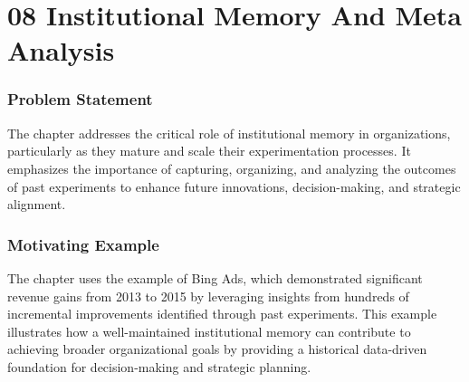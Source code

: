 \documentclass{article}
\begin{document}
\section*{08 Institutional Memory And Meta Analysis}
\subsubsection*{Problem Statement}
The chapter addresses the critical role of institutional memory in organizations, particularly as they mature and scale their experimentation processes. It emphasizes the importance of capturing, organizing, and analyzing the outcomes of past experiments to enhance future innovations, decision-making, and strategic alignment.

\subsubsection*{Motivating Example}
The chapter uses the example of Bing Ads, which demonstrated significant revenue gains from 2013 to 2015 by leveraging insights from hundreds of incremental improvements identified through past experiments. This example illustrates how a well-maintained institutional memory can contribute to achieving broader organizational goals by providing a historical data-driven foundation for decision-making and strategic planning.
\end{document}
